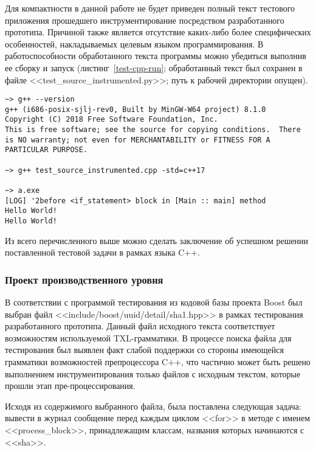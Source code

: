 Для компактности в данной работе не будет приведен полный текст тестового приложения прошедшего инструментирование посредством разработанного прототипа.
Причиной также является отсутствие каких-либо более специфических особенностей, накладываемых целевым языком программирования.
В работоспособности обработанного текста программы можно убедиться выполнив ее сборку и запуск (листинг~\ref{test-cpp-run}; обработанный текст был сохранен в файле <<test\_source\_instrumented.py>>; путь к рабочей директории опущен).

\begin{lstlisting}[frame=single, label={test-cpp-run}, caption={Результаты сборки и запуска обработанного тестового приложения.}]
~> g++ --version
g++ (i686-posix-sjlj-rev0, Built by MinGW-W64 project) 8.1.0
Copyright (C) 2018 Free Software Foundation, Inc.
This is free software; see the source for copying conditions.  There is NO warranty; not even for MERCHANTABILITY or FITNESS FOR A PARTICULAR PURPOSE.

~> g++ test_source_instrumented.cpp -std=c++17

~> a.exe
[LOG] '2before <if_statement> block in [Main :: main] method
Hello World!
Hello World!
\end{lstlisting}

Из всего перечисленного выше можно сделать заключение об успешном решении поставленной тестовой задачи в рамках языка C++.

\subsubsection{Проект производственного уровня}

В соответствии с программой тестирования из кодовой базы проекта Boost был выбран файл <<include/boost/uuid/detail/sha1.hpp>> в рамках тестирования разработанного прототипа.
Данный файл исходного текста соответствует возможностям используемой TXL-грамматики.
В процессе поиска файла для тестирования был выявлен факт слабой поддержки со стороны имеющейся грамматики возможностей препроцессора C++, что частично может быть решено выполнением инструментирования только файлов с исходным текстом, которые прошли этап пре-процессирования.

Исходя из содержимого выбранного файла, была поставлена следующая задача:
вывести в журнал сообщение перед каждым циклом <<for>> в методе с именем <<process\_block>>, принадлежащим классам, названия которых начинаются с <<sha>>.

